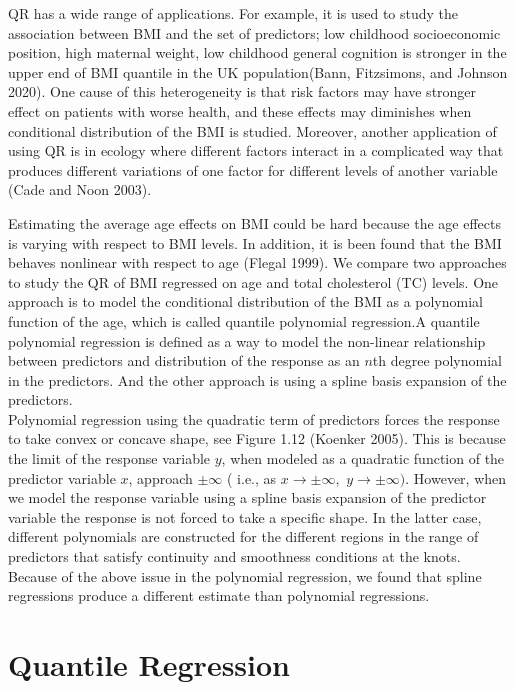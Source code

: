 \documentclass[
  12pt,
]{article}
\begin{document}
QR has a wide range of applications. For example, it is used to study the association between BMI and the set of predictors; low childhood socioeconomic position, high maternal weight, low childhood general cognition is stronger in the upper end of BMI quantile in the UK population(Bann, Fitzsimons, and Johnson 2020). One cause of this heterogeneity is that risk factors may have stronger effect on patients with worse health, and these effects may diminishes when conditional distribution of the BMI is studied.
Moreover, another application of using QR is in ecology where different factors interact in a complicated way that produces different variations of one factor for different levels of another variable (Cade and Noon 2003).

Estimating the average age effects on BMI could be hard because the age effects is varying with respect to BMI levels. In addition, it is been found that the BMI behaves nonlinear with respect to age (Flegal 1999).
We compare two approaches to study the QR of BMI regressed on age and total cholesterol (TC) levels. One approach is to model the conditional distribution of the BMI as a polynomial function of the age, which is called quantile polynomial regression.A quantile polynomial regression is defined as a way to model the non-linear relationship between predictors and distribution of the response as an \(n\)th degree polynomial in the predictors. And the other approach is using a spline basis expansion of the predictors.\\
Polynomial regression using the quadratic term of predictors forces the response to take convex or concave shape, see Figure 1.12 (Koenker 2005). This is because the limit of the response variable \(y\), when modeled as a quadratic function of the predictor variable \(x\), approach \(\pm\infty\) ( i.e., as \(x \rightarrow\pm\infty,\) \(y\rightarrow\pm\infty).\) However, when we model the response variable using a spline basis expansion of the predictor variable the response is not forced to take a specific shape. In the latter case, different polynomials are constructed for the different regions in the range of predictors that satisfy continuity and smoothness conditions at the knots.
Because of the above issue in the polynomial regression, we found that spline regressions produce a different estimate than polynomial regressions.

\section{Quantile Regression}
\end{document}
